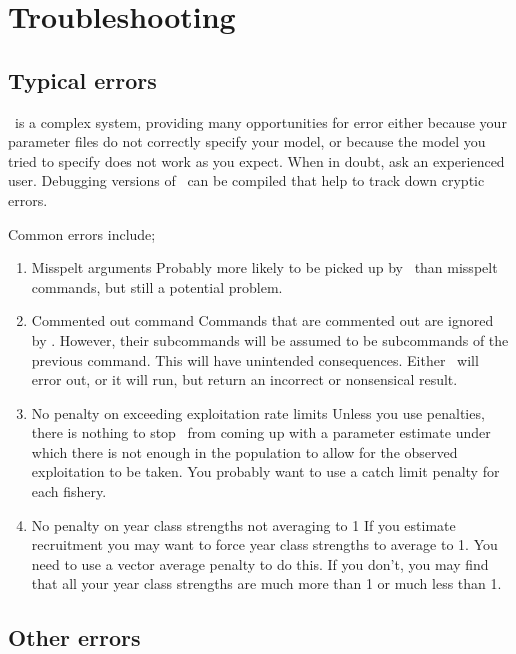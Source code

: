 \section{Troubleshooting\label{sec:trouble-shooting}}

\subsection{Typical errors\label{sec:typical-errors}}

\SPM\ is a complex system, providing many opportunities for error \textemdash either because your parameter files do not correctly specify your model, or because the model you tried to specify does not work as you expect. When in doubt, ask an experienced user. Debugging versions of \SPM\ can be compiled that help to track down cryptic errors.

Common errors include;
\begin{enumerate}
\item Misspelt arguments
Probably more likely to be picked up by \SPM\ than misspelt commands, but still a potential problem. 

\item Commented out command
Commands that are commented out are ignored by \SPM. However, their subcommands will be assumed to be subcommands of the previous command. This will have unintended consequences. Either \SPM\ will error out, or it will run, but return an incorrect or nonsensical result. 

\item No penalty on exceeding exploitation rate limits
Unless you use penalties, there is nothing to stop \SPM\ from coming up with a parameter estimate under which there is not enough in the population to allow for the observed exploitation to be taken. You probably want to use a catch limit penalty for each fishery. 

\item No penalty on year class strengths not averaging to 1
If you estimate recruitment you may want to force year class strengths to average to 1. You need to use a vector average penalty to do this. If you don't, you may find that all your year class strengths are much more than 1 or much less than 1. 
\end{enumerate}

\subsection{Other errors}

